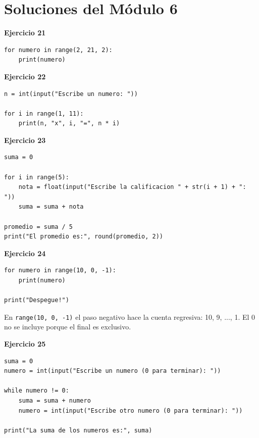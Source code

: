 \documentclass[12pt,a4paper]{article}
\begin{document}
\section{Soluciones del Módulo 6}

\begin{cajaSolucion}
\textbf{Ejercicio 21}
\begin{lstlisting}[style=pythonStyle]
for numero in range(2, 21, 2):
    print(numero)
\end{lstlisting}
\end{cajaSolucion}

\begin{cajaSolucion}
\textbf{Ejercicio 22}
\begin{lstlisting}[style=pythonStyle]
n = int(input("Escribe un numero: "))

for i in range(1, 11):
    print(n, "x", i, "=", n * i)
\end{lstlisting}
\end{cajaSolucion}

\begin{cajaSolucion}
\textbf{Ejercicio 23}
\begin{lstlisting}[style=pythonStyle]
suma = 0

for i in range(5):
    nota = float(input("Escribe la calificacion " + str(i + 1) + ": "))
    suma = suma + nota

promedio = suma / 5
print("El promedio es:", round(promedio, 2))
\end{lstlisting}
\end{cajaSolucion}

\begin{cajaSolucion}
\textbf{Ejercicio 24}
\begin{lstlisting}[style=pythonStyle]
for numero in range(10, 0, -1):
    print(numero)

print("Despegue!")
\end{lstlisting}

\begin{cajaNota}
En \texttt{range(10, 0, -1)} el paso negativo hace la cuenta regresiva: 10, 9, ..., 1. El 0 no se incluye porque el final es exclusivo.
\end{cajaNota}
\end{cajaSolucion}

\begin{cajaSolucion}
\textbf{Ejercicio 25}
\begin{lstlisting}[style=pythonStyle]
suma = 0
numero = int(input("Escribe un numero (0 para terminar): "))

while numero != 0:
    suma = suma + numero
    numero = int(input("Escribe otro numero (0 para terminar): "))

print("La suma de los numeros es:", suma)
\end{lstlisting}
\end{cajaSolucion}
\end{document}
